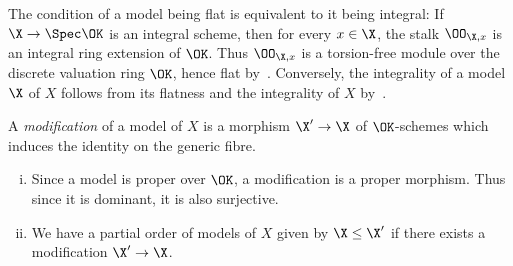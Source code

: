 \begin{remark} \label{rem:flatIffIntegral}
    The condition of a model being flat is equivalent to it being integral:
    If $\X \to \Spec \OK $ is an integral scheme, then for every $x\in \X$, the stalk $\OO_{\X,x}$ is an integral ring extension of $\OK$.
    Thus $\OO_{\X,x}$ is a torsion-free module over the discrete valuation ring $\OK$, hence flat by~\cite[Corollary 1.2.14]{Liu}.
    Conversely, the integrality of a model $\X$ of $X$ follows from its flatness and the integrality of $X$ by~\cite[Proposition 4.3.8]{Liu}.
\end{remark}

\begin{definition}
    A \textit{modification} of a model of $X$ is a morphism $\X' \to \X$ of $\OK $-schemes which induces the
    identity on the generic fibre.
\end{definition}

\begin{remark}\label{rem:modifications-are-surjective-and-partial-order-of-models}
    \begin{enumerate}[(i)]
        \item Since a model is proper over $\OK $, a modification is a proper morphism.
            Thus since it is dominant, it is also surjective.
        \item We have a partial order of models of $X$ given by $\X \leq \X'$ if there exists a modification $\X' \to \X$.
    \end{enumerate}
\end{remark}

